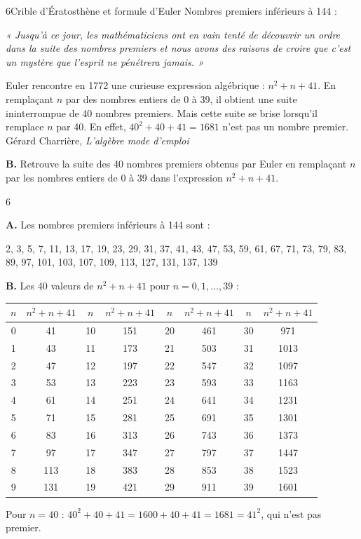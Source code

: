 \begin{exercice}{6}{Crible d'Ératosthène et formule d'Euler}
\medskip
Nombres premiers inférieurs à 144 : \dotfill

\dotfill

\medskip
\textit{« Jusqu'à ce jour, les mathématiciens ont en vain tenté de découvrir un ordre dans la suite des nombres premiers et nous avons des raisons de croire que c'est un mystère que l'esprit ne pénétrera jamais. »}

\medskip
Euler rencontre en 1772 une curieuse expression algébrique : $n^2 + n + 41$. En remplaçant $n$ par des nombres entiers de 0 à 39, il obtient une suite ininterrompue de 40 nombres premiers. Mais cette suite se brise lorsqu'il remplace $n$ par 40. En effet, $40^2 + 40 + 41 = 1681$ n'est pas un nombre premier. \hfill{\small Gérard Charrière, \textit{L'algèbre mode d'emploi}}

\medskip
\textbf{B.} Retrouve la suite des 40 nombres premiers obtenus par Euler en remplaçant $n$ par les nombres entiers de 0 à 39 dans l'expression $n^2 + n + 41$.

\end{exercice}
\begin{solution}{6}

\textbf{A.} Les nombres premiers inférieurs à 144 sont :

2, 3, 5, 7, 11, 13, 17, 19, 23, 29, 31, 37, 41, 43, 47, 53, 59, 61, 67, 71, 73, 79, 83, 89, 97, 101, 103, 107, 109, 113, 127, 131, 137, 139

\medskip
\textbf{B.} Les 40 valeurs de $n^2 + n + 41$ pour $n = 0, 1, \ldots, 39$ :

\medskip
\begin{tabular}{|c|c||c|c||c|c||c|c|}
\hline
$n$ & $n^2+n+41$ & $n$ & $n^2+n+41$ & $n$ & $n^2+n+41$ & $n$ & $n^2+n+41$ \\
\hline
0  & 41  & 10 & 151 & 20 & 461 & 30 & 971  \\
1  & 43  & 11 & 173 & 21 & 503 & 31 & 1013 \\
2  & 47  & 12 & 197 & 22 & 547 & 32 & 1097 \\
3  & 53  & 13 & 223 & 23 & 593 & 33 & 1163 \\
4  & 61  & 14 & 251 & 24 & 641 & 34 & 1231 \\
5  & 71  & 15 & 281 & 25 & 691 & 35 & 1301 \\
6  & 83  & 16 & 313 & 26 & 743 & 36 & 1373 \\
7  & 97  & 17 & 347 & 27 & 797 & 37 & 1447 \\
8  & 113 & 18 & 383 & 28 & 853 & 38 & 1523 \\
9  & 131 & 19 & 421 & 29 & 911 & 39 & 1601 \\
\hline
\end{tabular}

\medskip
Pour $n = 40$ : $40^2 + 40 + 41 = 1600 + 40 + 41 = 1681 = 41^2$, qui n'est pas premier.

\end{solution}
